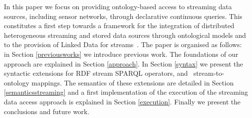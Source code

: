 In this paper we focus on providing ontology-based access to streaming data sources, including sensor networks, through
declarative continuous queries. This constitutes a first step towards a framework for the integration of distributed
heterogeneous streaming and stored data sources through ontological models and to the provision of Linked Data for
streams~\cite{LePhuoc_09,Page_09,Sequeda_09}. The paper is organised as follows: in Section \ref{previousworks} we
introduce previous work. The foundations of our approach are explained in Section \ref{approach}. In Section
\ref{syntax} we present the syntactic extensions for RDF stream SPARQL operators, and \rtwoo\ stream-to-ontology
mappings. The semantics of these extensions are detailed in Section \ref{semanticsstreaming} and a first implementation
of the execution of the streaming data access approach is explained in Section \ref{execution}. Finally we present the
conclusions and future work.

